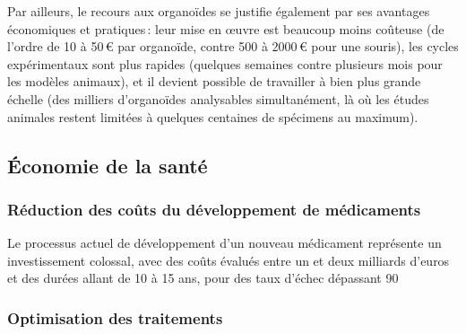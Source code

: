 Par ailleurs, le recours aux organoïdes se justifie également par ses avantages économiques et pratiques : leur mise en œuvre est beaucoup moins coûteuse (de l’ordre de 10 à 50 € par organoïde, contre 500 à 2000 € pour une souris), les cycles expérimentaux sont plus rapides (quelques semaines contre plusieurs mois pour les modèles animaux), et il devient possible de travailler à bien plus grande échelle (des milliers d’organoïdes analysables simultanément, là où les études animales restent limitées à quelques centaines de spécimens au maximum).

\subsection{Économie de la santé}

\subsubsection{Réduction des coûts du développement de médicaments}

Le processus actuel de développement d’un nouveau médicament représente un investissement colossal, avec des coûts évalués entre un et deux milliards d’euros et des durées allant de 10 à 15 ans, pour des taux d’échec dépassant 90 %

\subsubsection{Optimisation des traitements}


